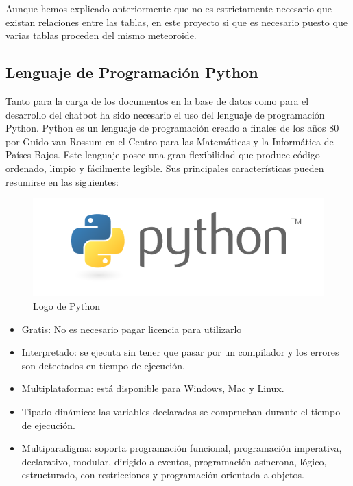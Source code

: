 Aunque hemos explicado anteriormente que no es estrictamente necesario que existan relaciones entre las tablas, en este proyecto si que es necesario puesto que varias tablas proceden del mismo meteoroide.


\newpage
\subsection{Lenguaje de Programación Python}

Tanto para la carga de los documentos en la base de datos como para el desarrollo del chatbot ha sido necesario el uso del lenguaje de programación Python. Python es un lenguaje de programación creado a finales de los años 80 por Guido van Rossum en el Centro para las Matemáticas y la Informática de Países Bajos. Este lenguaje posee una gran flexibilidad que produce código ordenado, limpio y fácilmente legible. Sus principales características pueden resumirse en las siguientes\cite{python}:

\begin{figure}[h]
    \centering
    \includegraphics[scale=0.4]{include/figuras/python.png}
    \caption{Logo de Python}
    \label{fig:Python}
\end{figure}

\begin{itemize}
    \item Gratis: No es necesario pagar licencia para utilizarlo
    \item Interpretado: se ejecuta sin tener que pasar por un compilador y los errores son detectados en tiempo de ejecución.
    \item Multiplataforma: está disponible para Windows, Mac y Linux. 
    \item Tipado dinámico: las variables declaradas se comprueban durante el tiempo de ejecución.
    \item Multiparadigma: soporta programación funcional, programación imperativa, declarativo, modular, dirigido a eventos, programación asíncrona, lógico, estructurado, con restricciones y programación orientada a objetos.
\end{itemize}

